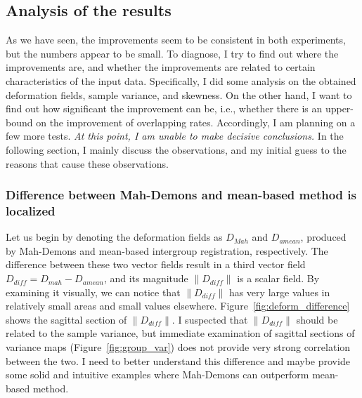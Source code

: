 \documentclass[preprint,review,12pt]{elsarticle}
\newcommand{\ie}{{i.e., }}
\begin{document}
\subsection{Analysis of the results}
As we have seen, the improvements seem to be consistent in both experiments, but the numbers appear to be small. To diagnose, I try to find out where the improvements are, and whether the improvements are related to certain characteristics of the input data. Specifically, I did some analysis on the obtained deformation fields, sample variance, and skewness. On the other hand, I want to find out how significant the improvement can be, \ie whether there is an upper-bound on the improvement of overlapping rates. Accordingly, I am planning on a few more tests. {\it At this point, I am unable to make decisive conclusions.} In the following section, I mainly discuss the observations, and my initial guess to the reasons that cause these observations.

\subsubsection{Difference between Mah-Demons and mean-based method is localized}

Let us begin by denoting the deformation fields as $D_{Mah}$ and $D_{amean}$, produced by Mah-Demons and mean-based intergroup registration, respectively. The difference between these two vector fields result in a third vector field $D_{diff}=D_{mah}-D_{amean}$, and its magnitude $\|D_{diff}\|$ is a scalar field. By examining it visually, we can notice that  $\|D_{diff}\|$ has very large values in relatively small areas and small values elsewhere. Figure~\ref{fig:deform_difference} shows the sagittal section of  $\|D_{diff}\|$. I suspected that $\|D_{diff}\|$ should be related to the sample variance, but immediate examination of sagittal sections of variance maps (Figure~\ref{fig:group_var}) does not provide very strong correlation between the two. I need to better understand this difference and maybe provide some solid and intuitive examples where Mah-Demons can outperform mean-based method.
\end{document}
